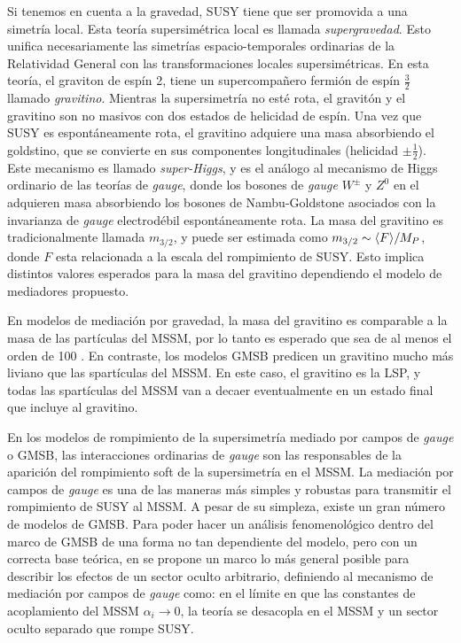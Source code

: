 Si tenemos en cuenta a la gravedad, SUSY tiene que ser promovida a una simetría
local. Esta teoría supersimétrica local es llamada \emph{supergravedad}. Esto
unifica necesariamente las simetrías espacio-temporales ordinarias de la
Relatividad General con las transformaciones locales supersimétricas. En esta
teoría, el graviton de espín 2, tiene un supercompa\~nero fermión de espín $\frac{3}{2}$
llamado \emph{gravitino}. Mientras la supersimetría no esté rota, el gravitón y
el gravitino son no masivos con dos estados de helicidad de espín. Una vez que
SUSY es espontáneamente rota, el gravitino adquiere una masa absorbiendo el
goldstino, que se convierte en sus componentes longitudinales (helicidad $\pm
\frac{1}{2}$). Este mecanismo es llamado \emph{super-Higgs}, y es el análogo al
mecanismo de Higgs ordinario de las teorías de \emph{gauge}, donde los bosones de \emph{gauge}
$W^\pm$ y $Z^0$ en el {\SM} adquieren masa absorbiendo los bosones de
Nambu-Goldstone asociados con la invarianza de \emph{gauge} electrodébil
espontáneamente rota. La masa del gravitino es tradicionalmente llamada
$m_{3/2}$, y puede ser estimada como $m_{3/2} \sim \langle F \rangle / M_P$,
donde $F$ esta relacionada a la escala del rompimiento de SUSY. Esto implica
distintos valores esperados para la masa del gravitino dependiendo el modelo de
mediadores propuesto.

En modelos de mediación por gravedad, la masa del gravitino es comparable a la
masa de las partículas del MSSM, por lo tanto es esperado que sea de al menos el
orden de 100 \gev. En contraste, los modelos GMSB predicen un gravitino mucho
más liviano que las spartículas del MSSM. En este caso, el gravitino es la LSP,
y todas las spartículas del MSSM van a decaer eventualmente en un estado final
que incluye al gravitino.

En los modelos de rompimiento de la supersimetría mediado por campos de \emph{gauge} o
GMSB, las interacciones ordinarias de \emph{gauge} son las responsables de la aparición
del rompimiento soft de la supersimetría en el MSSM.
La mediación por campos de \emph{gauge} es una de las maneras más simples y robustas
para transmitir el rompimiento de SUSY al MSSM. A pesar de su simpleza, existe
un gran número de modelos de GMSB. Para poder hacer un análisis fenomenológico
dentro del marco de GMSB de una forma no tan dependiente del modelo, pero con un
correcta base teórica, en \cite{GGM} se propone un marco lo más general posible
para describir los efectos de un sector oculto arbitrario, definiendo al
mecanismo de mediación por campos de \emph{gauge} como: en el límite en que las
constantes de acoplamiento del MSSM $\alpha_i \to 0$, la teoría se desacopla
en el MSSM y un sector oculto separado que rompe SUSY.

